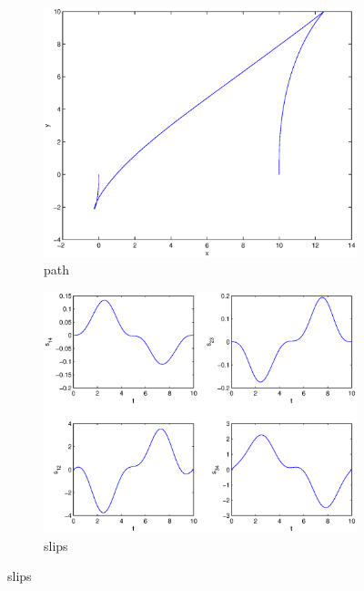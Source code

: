 \begin{figure}
\begin{subfigure}[b]{\textwidth}
\centering
\includegraphics[height=0.3\textheight]{img/final_1_15_10_path.eps}
\caption{path}
\end{subfigure}

\begin{subfigure}[b]{\textwidth}
\centering
\includegraphics[height=0.3\textheight]{img/final_1_15_10_slips.eps}
\caption{slips}
\end{subfigure}


\end{figure}
